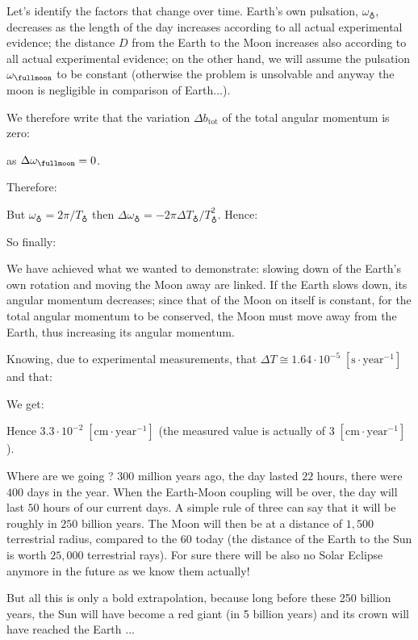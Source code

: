 	Let's identify the factors that change over time. Earth's own pulsation, $\omega_{\earth}$, decreases as the length of the day increases according to all actual experimental evidence; the distance $D$ from the Earth to the Moon increases also according to all actual experimental evidence; on the other hand, we will assume the pulsation $\omega_{\fullmoon}$ to be constant (otherwise the problem is unsolvable and anyway the moon is negligible in comparison of Earth...).
	
	We therefore write that the variation $\Delta b_{\text{tot}}$ of the total angular momentum is zero:
	
	as $\Delta \omega_{\fullmoon}=0$.
	
	Therefore:
	
	But $\omega_{\earth}=2\pi/T_{\earth}$ then $\Delta \omega_{\earth}=-2\pi\Delta T_{\earth}/T_{\earth}^2$. Hence:
	
	So finally:
	
	We have achieved what we wanted to demonstrate: slowing down of the Earth's own rotation and moving the Moon away are linked. If the Earth slows down, its angular momentum decreases; since that of the Moon on itself is constant, for the total angular momentum to be conserved, the Moon must move away from the Earth, thus increasing its angular momentum.
	
	Knowing, due to experimental measurements, that $\Delta T\cong 1.64\cdot 10^{-5}\;[\text{s}\cdot\text{year}^{-1}]$ and that:
	
	We get:
	
	Hence $3.3\cdot 10^{-2}\;[\text{cm}\cdot\text{year}^{-1}]$ (the measured value is actually of $3\;[\text{cm}\cdot\text{year}^{-1}]$).
	
	Where are we going ? $300$ million years ago, the day lasted $22$ hours, there were $400$ days in the year. When the Earth-Moon coupling will be over, the day will last $50$ hours of our current days. A simple rule of three can say that it will be roughly in $250$ billion years. The Moon will then be at a distance of $1,500$ terrestrial radius, compared to the $60$ today (the distance of the Earth to the Sun is worth $25,000$ terrestrial rays). For sure there will be also no Solar Eclipse anymore in the future as we know them actually!
	
	But all this is only a bold extrapolation, because long before these 250 billion years, the Sun will have become a red giant (in 5 billion years) and its crown will have reached the Earth ...
	
